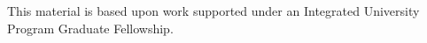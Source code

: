 This material is based upon work supported under an Integrated University Program Graduate Fellowship.